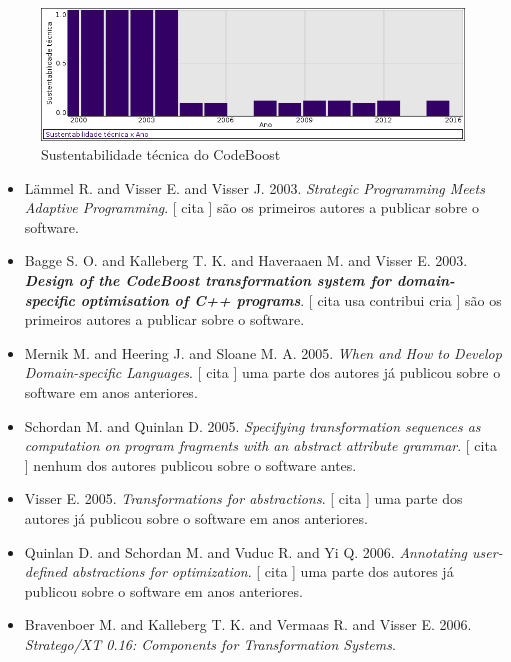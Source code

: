 \begin{figure}[h]
  \center
  \includegraphics[scale=0.50]{imagens/softwares-charts/codeboost.png}
  \caption{Sustentabilidade técnica do CodeBoost}
\end{figure}


\begin{itemize}
\item L\"{a}mmel R. and Visser E. and Visser J.
      2003.
        \textit{ Strategic Programming Meets Adaptive Programming}.
      [
          cita
      ]
são os primeiros autores a publicar sobre o software.
\item Bagge S. O. and Kalleberg T. K. and Haveraaen M. and Visser E.
      2003.
        \textbf{\textit{ Design of the CodeBoost transformation system for domain-specific optimisation of C++ programs}}.
      [
          cita
          usa
          contribui
          cria
      ]
são os primeiros autores a publicar sobre o software.
\item Mernik M. and Heering J. and Sloane M. A.
      2005.
        \textit{ When and How to Develop Domain-specific Languages}.
      [
          cita
      ]
uma parte dos autores já publicou sobre o software em anos anteriores.
\item Schordan M. and Quinlan D.
      2005.
        \textit{ Specifying transformation sequences as computation on program fragments with an abstract attribute grammar}.
      [
          cita
      ]
nenhum dos autores publicou sobre o software antes.
\item Visser E.
      2005.
        \textit{ Transformations for abstractions}.
      [
          cita
      ]
uma parte dos autores já publicou sobre o software em anos anteriores.
\item Quinlan D. and Schordan M. and Vuduc R. and Yi Q.
      2006.
        \textit{ Annotating user-defined abstractions for optimization}.
      [
          cita
      ]
uma parte dos autores já publicou sobre o software em anos anteriores.
\item Bravenboer M. and Kalleberg T. K. and Vermaas R. and Visser E.
      2006.
        \textit{ Stratego/XT 0.16: Components for Transformation Systems}.

\end{itemize}

